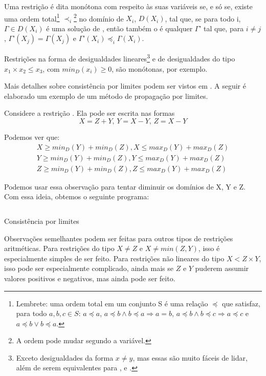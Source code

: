 \documentclass{article}
\begin{document}
\begin{definition}
  Uma restrição  é dita monótona com respeito às suas
  variáveis  se, e só se, existe uma ordem
  total\footnote{Lembrete: uma ordem total em um conjunto S é uma
    relação $\preceq$ que satisfaz, para todo $a, b, c \in S$: $a
    \preceq a$, $a \preceq b \wedge b \preceq a \Rightarrow a = b$,
    $a\preceq b \wedge b \preceq c \Rightarrow a \preceq c$ e
    $a\preceq b \vee b\preceq a$.}  $\prec_i$\footnote{A ordem pode
    mudar segundo a variável.}  no domínio de $X_i$, $D(X_i)$,
  tal que, se para todo i, $\Gamma \in D(X_i)$ é uma solução de
  , então também o é qualquer $\Gamma$' tal que, para $i
  \neq j$, $\Gamma$'$(X_j) = \Gamma(X_j)$ e $\Gamma$'$(X_i) \preceq_i
  \Gamma(X_i)$.
\end{definition}

Restrições na forma de desigualdades lineares\footnote{Exceto
  desigualdades da forma $x \neq y$, mas essas são muito fáceis de
  lidar, além de serem equivalentes para \boundd, \boundz{} e
  \boundr.} e de desigualdades do tipo $x_1 \times x_2 \leq x_3$, com
$min_D(x_i) \geq 0$, são monótonas, por exemplo.

Mais detalhes sobre consistência por limites podem ser vistos em
\cite{choi}. A seguir é elaborado um exemplo de um método de
propagação por limites.

Considere a restrição . Ela pode ser escrita nas
formas
\[
X = Z + Y \text{, } Y = X - Y \text{, } Z = X - Y
\]

Podemos ver que:
\begin{gather}
  X \geq min_D(Y)+min_D(Z), X \leq max_D(Y) + max_D(Z)\\ Y \geq
  min_D(Y)+min_D(Z), Y \leq max_D(Y) + max_D(Z)\\ Z \geq
  min_D(Y)+min_D(Z), Z \leq max_D(Y) + max_D(Z)
\end{gather}

Podemos usar essa observação para tentar diminuir os domínios de X, Y
e Z. Com essa ideia, obtemos o seguinte programa:

\begin{listing}[H]
  \inputminted{prolog}{../Exemplos/Cap9/bounds_consistency.pl}
  \caption{Consistência por limites}\label{lst:bounds}
\end{listing}

Observações semelhantes podem ser feitas para outros tipos de
restrições aritméticas. Para restrições do tipo $X \neq Z$ e $X \neq
min(Z, Y)$, isso é especialmente simples de ser feito. Para restrições
não lineares do tipo $X < Z\times Y$, isso pode ser especialmente
complicado, ainda mais se $Z$ e $Y$ puderem assumir valores positivos
e negativos, mas ainda pode ser feito.
\end{document}
